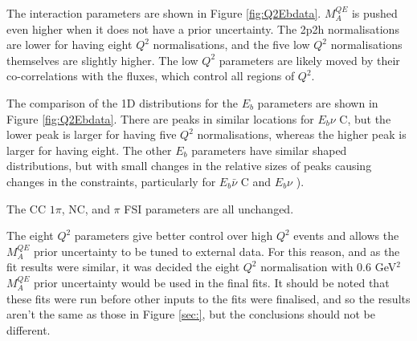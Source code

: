The interaction parameters are shown in Figure \ref{fig:Q2Ebdata}. $M_{A}^{QE}$ is pushed even higher when it does not have a prior uncertainty. The 2p2h normalisations are lower for having eight $Q^2$ normalisations, and the five low $Q^2$ normalisations themselves are slightly higher. The low $Q^2$ parameters are likely moved by their co-correlations with the fluxes, which control all regions of $Q^2$.

The comparison of the 1D distributions for the $E_b$ parameters are shown in Figure \ref{fig:Q2Ebdata}. There are peaks in similar locations for $E_b \nu$ C, but the lower peak is larger for having five $Q^2$ normalisations, whereas the higher peak is larger for having eight. The other $E_b$ parameters have similar shaped distributions, but with small changes in the relative sizes of peaks causing changes in the constraints, particularly for $E_b \bar{\nu}$ C and $E_b \nu$ ).

The CC $1\pi$, NC, and $\pi$ FSI parameters are all unchanged.

The eight $Q^2$ parameters give better control over high $Q^2$ events and allows the $M_{A}^{QE}$ prior uncertainty to be tuned to external data. For this reason, and as the fit results were similar, it was decided the eight $Q^2$ normalisation with 0.6 GeV$^2$ $M_{A}^{QE}$ prior uncertainty would be used in the final fits. It should be noted that these fits were run before other inputs to the fits were finalised, and so the results aren't the same as those in Figure \ref{sec:}, but the conclusions should not be different.

